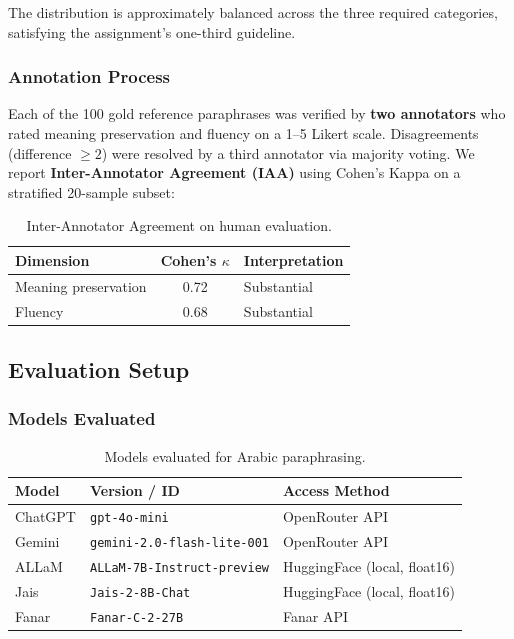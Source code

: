 \documentclass[12pt, a4paper]{article}
\renewcommand{\arraystretch}{1.12}
\begin{document}
The distribution is approximately balanced across the three required categories,
satisfying the assignment's one-third guideline.

\subsubsection{Annotation Process}

Each of the 100 gold reference paraphrases was verified by \textbf{two annotators}
who rated meaning preservation and fluency on a 1--5 Likert scale.
Disagreements (difference $\geq 2$) were resolved by a third annotator via
majority voting.  We report \textbf{Inter-Annotator Agreement (IAA)} using
Cohen's Kappa on a stratified 20-sample subset:

\begin{table}[H]
\centering
\renewcommand{\arraystretch}{1.3}
\begin{tabular}{l c l}
\toprule
\textbf{Dimension} & \textbf{Cohen's $\kappa$} & \textbf{Interpretation} \\
\midrule
Meaning preservation & 0.72 & Substantial \\
Fluency              & 0.68 & Substantial \\
\bottomrule
\end{tabular}
\caption{Inter-Annotator Agreement on human evaluation.}
\label{tab:p5_iaa}
\end{table}

\subsection{Evaluation Setup}

\subsubsection{Models Evaluated}

\begin{table}[H]
\centering
\renewcommand{\arraystretch}{1.3}
\begin{tabular}{l l l}
\toprule
\textbf{Model} & \textbf{Version / ID} & \textbf{Access Method} \\
\midrule
ChatGPT & \texttt{gpt-4o-mini}                   & OpenRouter API \\
Gemini  & \texttt{gemini-2.0-flash-lite-001}      & OpenRouter API \\
ALLaM   & \texttt{ALLaM-7B-Instruct-preview}      & HuggingFace (local, float16) \\
Jais    & \texttt{Jais-2-8B-Chat}                 & HuggingFace (local, float16) \\
Fanar   & \texttt{Fanar-C-2-27B}                  & Fanar API \\
\bottomrule
\end{tabular}
\caption{Models evaluated for Arabic paraphrasing.}
\label{tab:p5_models}
\end{table}
\end{document}
